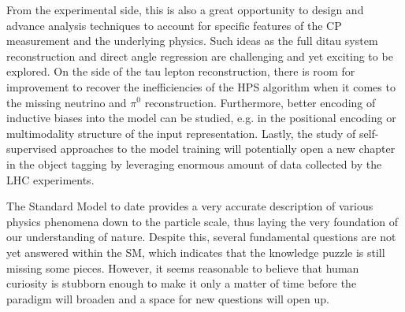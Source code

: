 From the experimental side, this is also a great opportunity to design and advance analysis techniques to account for specific features of the CP measurement and the underlying physics. Such ideas as the full ditau system reconstruction and direct \phicp angle regression are challenging and yet exciting to be explored. On the side of the tau lepton reconstruction, there is room for improvement to recover the inefficiencies of the HPS algorithm when it comes to the missing neutrino and $\pi^0$ reconstruction. Furthermore, better encoding of inductive biases into the model can be studied, e.g. in the positional encoding or multimodality structure of the input representation. Lastly, the study of self-supervised approaches to the model training will potentially open a new chapter in the object tagging by leveraging enormous amount of data collected by the LHC experiments. 

The Standard Model to date provides a very accurate description of various physics phenomena down to the particle scale, thus laying the very foundation of our understanding of nature. Despite this, several fundamental questions are not yet answered within the SM, which indicates that the knowledge puzzle is still missing some pieces. However, it seems reasonable to believe that human curiosity is stubborn enough to make it only a matter of time before the paradigm will broaden and a space for new questions will open up.